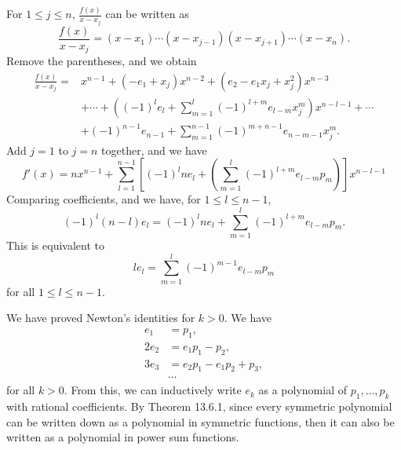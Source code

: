 \documentclass[a4paper, 12pt]{article}
\begin{document}
\begin{solution}
\begin{enumerate}[(a)]
For \(1\leq j\leq n\), \(\frac{f(x)}{x-x_j}\) can be written as 
\[\frac{f(x)}{x-x_j}=(x-x_1)\cdots (x-x_{j-1})(x-x_{j+1})\cdots(x-x_n).\]
Remove the parentheses, and we obtain 
\begin{align*}
    \frac{f(x)}{x-x_j}=&x^{n-1}+(-e_1+x_j)x^{n-2}+(e_2-e_1x_j+x_j^2)x^{n-3}\\
                       &+\cdots+((-1)^l e_l+\sum_{m=1}^{l} (-1)^{l+m}e_{l-m}x_j^{m})x^{n-l-1}+\cdots\\
                       &+(-1)^{n-1}e_{n-1}+\sum_{m=1}^{n-1} (-1)^{m+n-1}e_{n-m-1}x_j^{m}.
\end{align*}
Add \(j=1\) to \(j=n\) together, and we have 
\[f'(x)=nx^{n-1}+\sum_{l=1}^{n-1}[(-1)^l n e_l+(\sum_{m=1}^{l}(-1)^{l+m}e_{l-m}p_m)]x^{n-l-1}\]
Comparing coefficients, and we have, for \(1\leq l\leq n-1\), 
\[(-1)^l (n-l)e_l=(-1)^l n e_l+\sum_{m=1}^{l} (-1)^{l+m} e_{l-m}p_m.\]
This is equivalent to 
\[l e_l=\sum_{m=1}^{l}(-1)^{m-1} e_{l-m}p_m\]
for all \(1\leq l\leq n-1\).
\end{enumerate}

We have proved Newton's identities for \(k>0\). We have 
\begin{align*}
    e_1&=p_1,\\
    2e_2&=e_1p_1-p_2,\\
    3e_3&=e_2p_1-e_1p_2+p_3,\\ 
    &\cdots 
\end{align*}
for all \(k>0\). From this, we can inductively write \(e_k\) as a polynomial of \(p_1,\ldots,p_k\) with rational coefficients. By Theorem 13.6.1, since every symmetric polynomial can be written down as a polynomial in symmetric functions, then it can also be written as a polynomial in power sum functions. 
\end{solution}
\end{document}
